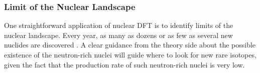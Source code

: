 \begin{comment}
Various EFT models are based on an effective interacting Lagragian, for example,
FSUGold model has the following effective Lagrangian \cite{PhysRevLett.95.122501}:
\begin{equation}
    \begin{aligned}
	\CL_{\text{int}} = &\bar{\psi} \left[ g_s\phi - \left( g_v V_\mu + \frac{g_\rho}{2}\vec{\tau}\cdot\vec{b}_\mu + \frac{e}{2}(1 + \tau_3) A_\mu \right)\gamma^\mu \right]\psi \\
	    & - \frac{\kappa}{3!}(g_s\phi)^3 - \frac{\lambda}{4!}(g_s\phi)^4 + \frac{\zeta}{4!}(g_v^2 V_\mu V^\mu )^2	\\
	    & + \Lambda_v(g_\rho^2\vec{b}_\mu\vec{b}^\mu)(g_v^2 V_\mu V^\mu)
    \end{aligned}
\end{equation}
This Lagrangian density descirbes interactions of the nucleon field $\psi$ to
various meson fields and their self-interctions. $\phi$ is a scalar.

The difference between different EFT models is just how many coupling they
include in their effetive Lagrangian density. With the Lagrangian density,
one can calculate the properties of various nuclei, fitting predicted values
to experimental results to get a parameter set for the coupling constant in
the Lagrangian, which is called one model. Frequently used EFT models include
NL3 \cite{}, FSUGold \cite{} and 
\end{comment}

\subsubsection{Limit of the Nuclear Landscape}

One straightforward application of nuclear DFT is to identify limits of the nuclear
landscape. Every year, as many as dozens or as few as several new nuclides
are discovered \cite{NEW_NULCIDES}. A clear guidance from the theory side
about the possible existence of the neutron-rich nuclei will guide where to look for
new rare isotopes, given the fact that the production rate of 
such neutron-rich nuclei is very low.

